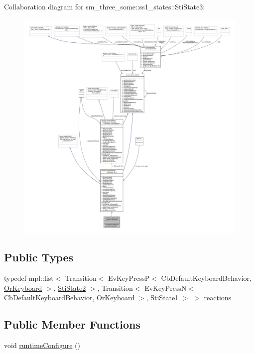 Collaboration diagram for sm\+\_\+three\+\_\+some\+:\+:ss1\+\_\+states\+:\+:Sti\+State3\+:
\nopagebreak
\begin{figure}[H]
\begin{center}
\leavevmode
\includegraphics[width=350pt]{structsm__three__some_1_1ss1__states_1_1StiState3__coll__graph}
\end{center}
\end{figure}
\subsection*{Public Types}
\begin{DoxyCompactItemize}
\item 
typedef mpl\+::list$<$ Transition$<$ Ev\+Key\+PressP$<$ Cb\+Default\+Keyboard\+Behavior, \hyperlink{classsm__three__some_1_1OrKeyboard}{Or\+Keyboard} $>$, \hyperlink{structsm__three__some_1_1ss1__states_1_1StiState2}{Sti\+State2} $>$, Transition$<$ Ev\+Key\+PressN$<$ Cb\+Default\+Keyboard\+Behavior, \hyperlink{classsm__three__some_1_1OrKeyboard}{Or\+Keyboard} $>$, \hyperlink{structsm__three__some_1_1ss1__states_1_1StiState1}{Sti\+State1} $>$ $>$ \hyperlink{structsm__three__some_1_1ss1__states_1_1StiState3_a2672f9f53573401ff5b62b95bf4d7b47}{reactions}
\end{DoxyCompactItemize}
\subsection*{Public Member Functions}
\begin{DoxyCompactItemize}
\item 
void \hyperlink{structsm__three__some_1_1ss1__states_1_1StiState3_a1fdf5fc281293f48a4082fc8e49e3e4b}{runtime\+Configure} ()
\end{DoxyCompactItemize}
